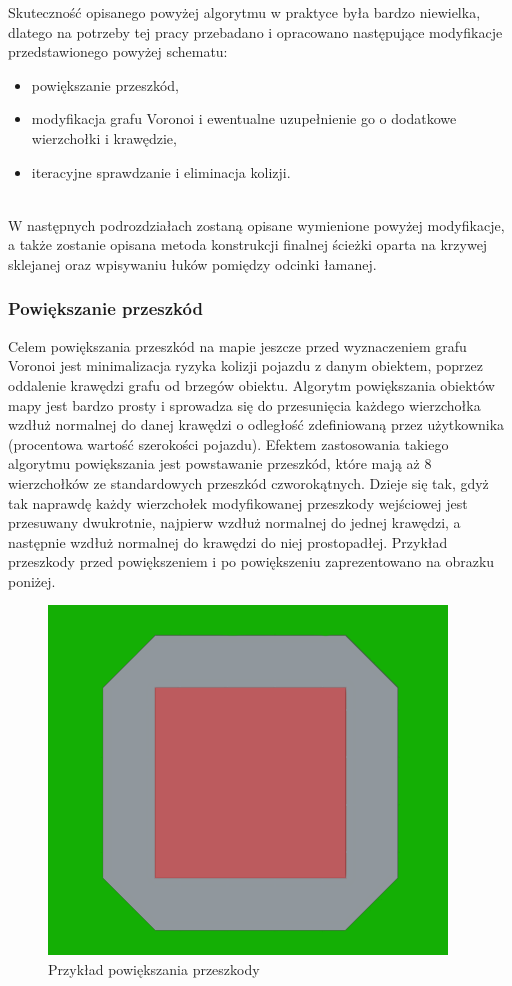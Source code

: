 \documentclass[a4paper,11pt,twoside]{report}
\theoremstyle{definition}
\begin{document}
Skuteczność opisanego powyżej algorytmu w praktyce była bardzo niewielka, dlatego na potrzeby tej pracy przebadano i opracowano następujące modyfikacje przedstawionego powyżej schematu:
\begin{itemize}
	\item powiększanie przeszkód,
	\item modyfikacja grafu Voronoi i ewentualne uzupełnienie go o dodatkowe wierzchołki i krawędzie,
	\item iteracyjne sprawdzanie i eliminacja kolizji.
\end{itemize}
~\\W następnych podrozdziałach zostaną opisane wymienione powyżej modyfikacje, a także zostanie opisana metoda konstrukcji finalnej ścieżki oparta na krzywej sklejanej oraz wpisywaniu łuków pomiędzy odcinki łamanej.

\subsubsection{Powiększanie przeszkód}

Celem powiększania przeszkód na mapie jeszcze przed wyznaczeniem grafu Voronoi jest minimalizacja ryzyka kolizji pojazdu z danym obiektem, poprzez oddalenie krawędzi grafu od brzegów obiektu. Algorytm powiększania obiektów mapy jest bardzo prosty i sprowadza się do przesunięcia każdego wierzchołka wzdłuż normalnej do danej krawędzi o odległość zdefiniowaną przez użytkownika (procentowa wartość szerokości pojazdu). Efektem zastosowania takiego algorytmu powiększania jest powstawanie przeszkód, które mają aż 8 wierzchołków ze standardowych przeszkód czworokątnych. Dzieje się tak, gdyż tak naprawdę każdy wierzchołek modyfikowanej przeszkody wejściowej jest przesuwany dwukrotnie, najpierw wzdłuż normalnej do jednej krawędzi, a następnie wzdłuż normalnej do krawędzi do niej prostopadłej. Przykład przeszkody przed powiększeniem i po powiększeniu zaprezentowano na obrazku poniżej.

\begin{figure}[h!]
\centering
\includegraphics[scale=0.5]{expandObstacleExample}
\caption[Przykład powiększania przeszkody]{Przykład powiększania przeszkody}
\end{figure}
\end{document}
